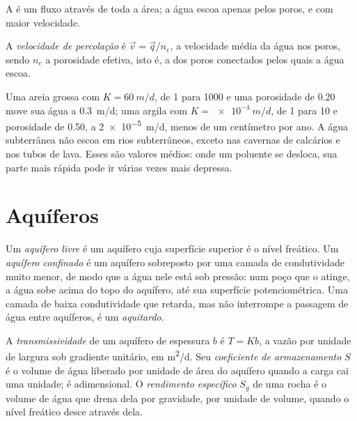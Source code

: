 A  é um fluxo através de toda a área; a água escoa
apenas pelos poros, e com maior velocidade.

\begin{definition}\label{def:b3:hydrogeology:seepage}
A \emph{velocidade de percolação} é $\vec v = \vec
q/n_e$, a velocidade média da água nos poros, sendo $n_e$ a
porosidade efetiva, isto é, a dos poros conectados pelos quais a água
escoa.
\end{definition}

Uma areia grossa com $K = \qty{60}{m/d}$,  de 1 para 1000 e uma
porosidade de 0.20 move sua água a \qty{0.3}{m/d}; uma argila com $K =
\qty{e-4}{m/d}$,  de 1 para 10 e porosidade de 0.50, a
\qty{2e-5}{m/d}, menos de um centímetro por ano. A água subterrânea não escoa
em rios subterrâneos, exceto nas cavernas de calcários e nos tubos de
lava. Esses são valores médios: onde um poluente se desloca, sua parte mais rápida pode
ir várias vezes mais depressa.

\section{Aquíferos}\label{sec:b3:hydrogeology:aquifers}

\begin{definition}\label{def:b3:hydrogeology:aquifer-types}
Um \emph{aquífero livre} é um aquífero cuja
superfície superior é o nível freático. Um \emph{aquífero
confinado} é um aquífero sobreposto por uma camada de condutividade
muito menor, de modo que a água nele está sob pressão: num poço que o atinge, a água sobe
acima do topo do aquífero, até sua
superfície potenciométrica. Uma camada de baixa condutividade que retarda, mas não
interrompe a passagem de água entre aquíferos, é um
\emph{aquitardo}.
\end{definition}

\begin{definition}\label{def:b3:hydrogeology:storage}
A \emph{transmissividade} de um aquífero de espessura
$b$ é $T = Kb$, a vazão por unidade de largura sob gradiente unitário, em
\unit{m^2/d}. Seu \emph{coeficiente de armazenamento} $S$ é o
volume de água liberado por unidade de área do
aquífero quando a carga cai uma unidade; é adimensional. O
\emph{rendimento específico} $S_y$ de uma rocha é o volume
de água que drena dela por gravidade, por unidade de volume, quando o nível
freático desce através dela.
\end{definition}

